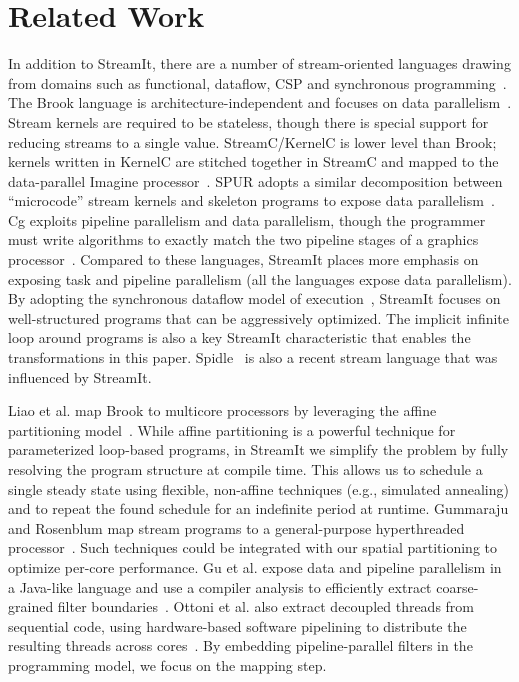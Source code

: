 \section{Related Work}
\label{sec:related}


In addition to StreamIt, there are a number of stream-oriented
languages drawing from domains such as functional, dataflow, CSP and
synchronous programming~\cite{survey97}.  The Brook language is
architecture-independent and focuses on data
parallelism~\cite{brook04}.  Stream kernels are required to be
stateless, though there is special support for reducing streams to a
single value.  Stream\-C/Ker\-nel\-C is lower level than Brook;
kernels written in KernelC are stitched together in StreamC and mapped
to the data-parallel Imagine processor~\cite{imagine03ieee}.  SPUR
adopts a similar decomposition between ``microcode'' stream kernels
and skeleton programs to expose data parallelism~\cite{spur05samos}.
Cg exploits pipeline parallelism and data parallelism, though the
programmer must write algorithms to exactly match the two pipeline
stages of a graphics processor~\cite{cg03}.  Compared to these
languages, StreamIt places more emphasis on exposing task and pipeline
parallelism (all the languages expose data parallelism).
By adopting the synchronous dataflow model of execution~\cite{lee87},
StreamIt focuses on well-structured programs that can be aggressively
optimized.  The implicit infinite loop around programs is also a key
StreamIt characteristic that enables the transformations in this
paper.  Spidle~\cite{spidle03} is also a recent stream language that
was influenced by StreamIt.

Liao et al. map Brook to multicore processors by leveraging the affine
partitioning model~\cite{liao06brook}.  While affine partitioning is a
powerful technique for parameterized loop-based programs, in StreamIt we
simplify the problem by fully resolving the program structure at
compile time.  This allows us to schedule a single steady state using
flexible, non-affine techniques (e.g., simulated annealing) and to
repeat the found schedule for an indefinite period at runtime.
Gummaraju and Rosenblum map stream programs to a general-purpose
hyperthreaded processor~\cite{gummaraju05micro}.  Such techniques
could be integrated with our spatial partitioning to optimize per-core
performance.  Gu et al. expose data and pipeline parallelism in a
Java-like language and use a compiler analysis to efficiently extract
coarse-grained filter boundaries~\cite{du03sc}.  Ottoni et al. also
extract decoupled threads from sequential code, using hardware-based
software pipelining to distribute the resulting threads across
cores~\cite{ottoni05decoupled}.  By embedding pipeline-parallel
filters in the programming model, we focus on the mapping step.


